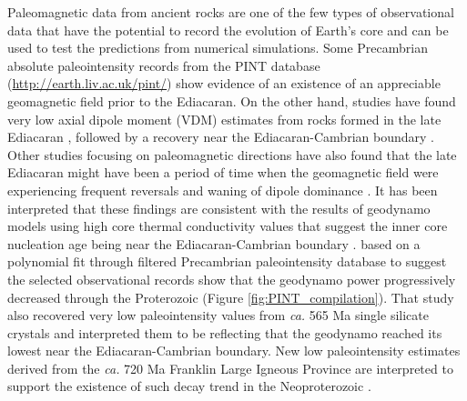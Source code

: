 \documentclass[9pt,twocolumn,twoside,lineno]{pnas-new}
\begin{document}
Paleomagnetic data from ancient rocks are one of the few types of observational data that have the potential to record the evolution of Earth’s core and can be used to test the predictions from numerical simulations. Some Precambrian absolute paleointensity records from the PINT database (\url{http://earth.liv.ac.uk/pint/}) show evidence of an existence of an appreciable geomagnetic field prior to the Ediacaran. On the other hand, studies have found very low axial dipole moment (VDM) estimates from rocks formed in the late Ediacaran \cite{Bono2019a, Shcherbakova2019a, Thallner2021b}, followed by a recovery near the Ediacaran-Cambrian boundary \cite{Thallner2021a}. Other studies focusing on paleomagnetic directions have also found that the late Ediacaran might have been a period of time when the geomagnetic field were experiencing frequent reversals and waning of dipole dominance \cite{Bono2015a, Kodama2020a}. It has been interpreted that these findings are consistent with the results of geodynamo models using high core thermal conductivity values that suggest the inner core nucleation age being near the Ediacaran-Cambrian boundary \cite{Driscoll2016a, Davies2021a}.  based on a polynomial fit through filtered Precambrian paleointensity database to suggest the selected observational records show that the geodynamo power progressively decreased through the Proterozoic (Figure \ref{fig:PINT_compilation}). That study also recovered very low paleointensity values from \textit{ca.} 565 Ma single silicate crystals and interpreted them to be reflecting that the geodynamo reached its lowest near the Ediacaran-Cambrian boundary. New low paleointensity estimates derived from the \textit{ca.} 720 Ma Franklin Large Igneous Province are interpreted to support the existence of such decay trend in the Neoproterozoic \cite{Lloyd2021a}. 
\end{document}
